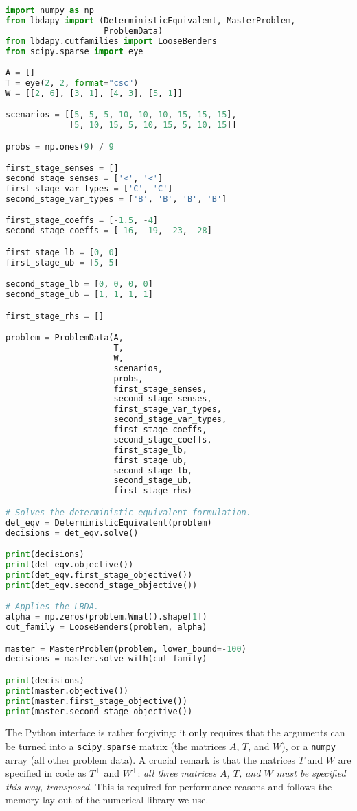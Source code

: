 \documentclass[12pt, english]{article}
\begin{document}
\begin{lstlisting}[caption={Specifying a custom problem in Python.},
                   label={listing:custom_example_python},
                   language={Python}]
import numpy as np
from lbdapy import (DeterministicEquivalent, MasterProblem, 
					ProblemData)
from lbdapy.cutfamilies import LooseBenders
from scipy.sparse import eye

A = []
T = eye(2, 2, format="csc")
W = [[2, 6], [3, 1], [4, 3], [5, 1]]

scenarios = [[5, 5, 5, 10, 10, 10, 15, 15, 15],
             [5, 10, 15, 5, 10, 15, 5, 10, 15]]

probs = np.ones(9) / 9

first_stage_senses = []
second_stage_senses = ['<', '<']
first_stage_var_types = ['C', 'C']
second_stage_var_types = ['B', 'B', 'B', 'B']

first_stage_coeffs = [-1.5, -4]
second_stage_coeffs = [-16, -19, -23, -28]

first_stage_lb = [0, 0]
first_stage_ub = [5, 5]

second_stage_lb = [0, 0, 0, 0]
second_stage_ub = [1, 1, 1, 1]

first_stage_rhs = []

problem = ProblemData(A,
				      T,
					  W,
					  scenarios,
					  probs,
					  first_stage_senses,
					  second_stage_senses,
					  first_stage_var_types,
					  second_stage_var_types,
					  first_stage_coeffs,
					  second_stage_coeffs,
					  first_stage_lb,
					  first_stage_ub,
					  second_stage_lb,
					  second_stage_ub,
					  first_stage_rhs)

# Solves the deterministic equivalent formulation.
det_eqv = DeterministicEquivalent(problem)
decisions = det_eqv.solve()

print(decisions)
print(det_eqv.objective())
print(det_eqv.first_stage_objective())
print(det_eqv.second_stage_objective())

# Applies the LBDA.
alpha = np.zeros(problem.Wmat().shape[1])
cut_family = LooseBenders(problem, alpha)

master = MasterProblem(problem, lower_bound=-100)
decisions = master.solve_with(cut_family)

print(decisions)
print(master.objective())
print(master.first_stage_objective())
print(master.second_stage_objective())
\end{lstlisting}
The Python interface is rather forgiving: it only requires that the arguments can be turned into a \texttt{scipy.sparse} matrix (the matrices $A$, $T$, and $W$), or a \texttt{numpy} array (all other problem data). A crucial remark is that the matrices $T$ and $W$ are specified in code as $T^\top$ and $W^\top$: \emph{all three matrices $A$, $T$, and $W$ must be specified this way, transposed}. This is required for performance reasons and follows the memory lay-out of the numerical library we use. 
\end{document}

